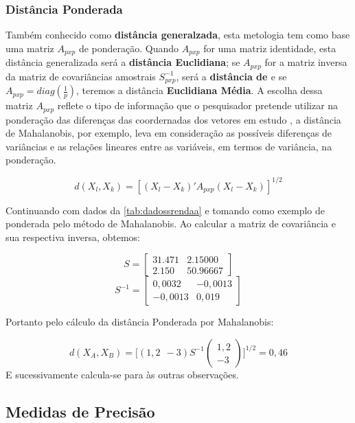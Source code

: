 \documentclass[
  openany]{book}
\begin{document}
\hypertarget{distponderada}{%
\subsubsection{Distância Ponderada}\label{distponderada}}

Também conhecido como \textbf{distância generalzada}, esta metologia tem como base uma matriz \(A_{pxp}\) de ponderação. Quando \(A_{pxp}\) for uma matriz identidade, esta distância generalizada será a \textbf{distância Euclidiana}; se \(A_{pxp}\) for a matriz inversa da matriz de covariâncias amostrais \(S^{-1}_{pxp}\), será a \textbf{distância de \citet{mahalanobis1936generalized}} e se \(A_{pxp}=diag(\frac{1}{p})\), teremos a distância \textbf{Euclidiana Média}. A escolha dessa matriz \(A_{pxp}\) reflete o tipo de informação que o pesquisador pretende utilizar na ponderação das diferenças das coordernadas dos vetores em estudo \citep{mingoti2007analise}, a distância de Mahalanobis, por exemplo, leva em consideração as possíveis diferenças de variâncias e as relações lineares entre as variáveis, em termos de variância, na ponderação.

\begin{equation} 
  d(X_l,X_k)=[(X_l-X_k)'A_{pxp}(X_l - X_k)]^{1/2}
  \label{eq:distpond}
\end{equation}

Continuando com dados da \ref{tab:dadossrendaa} e tomando como exemplo de ponderada pelo método de Mahalanobis. Ao calcular a matriz de covariância e sua respectiva inversa, obtemos:

\[S=
\begin{bmatrix}
31.471& 2.15000 \\
2.150& 50.96667 
\end{bmatrix}\]
\[S^{-1}=
\begin{bmatrix}
0,0032& -0,0013 \\
-0,0013& 0,019 
\end{bmatrix}\]

Portanto pelo cálculo da distância Ponderada por Mahalanobis:

\[d(X_A,X_B)=\bigg[(1,2 \ \ -3) S^{-1} \begin{pmatrix} 1,2 \\ -3  \end{pmatrix} \bigg]^{1/2}=0,46\]
E sucessivamente calcula-se para às outras observações.

\hypertarget{medidas-de-precisuxe3o}{%
\subsection{Medidas de Precisão}\label{medidas-de-precisuxe3o}}
\end{document}
